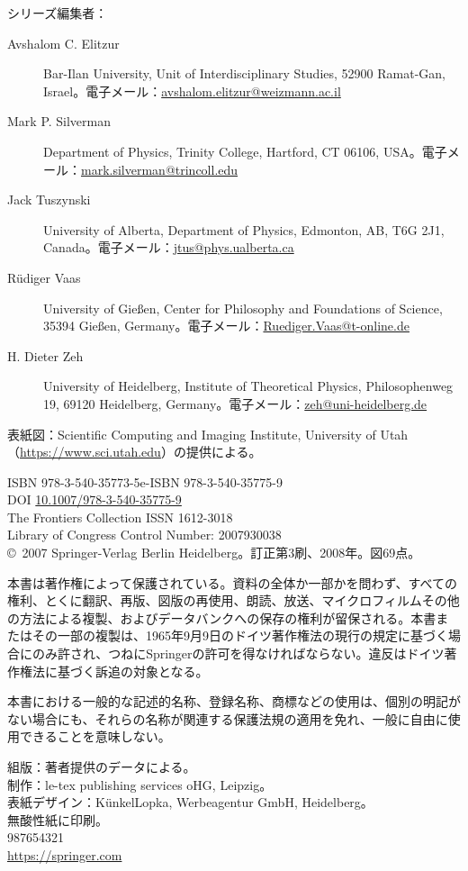 \medskip\noindent シリーズ編集者：
\begin{description}
\item[Avshalom C. Elitzur] Bar-Ilan University, Unit of Interdisciplinary Studies, 52900 Ramat-Gan, Israel。電子メール：\href{mailto:avshalom.elitzur@weizmann.ac.il}{avshalom.elitzur@weizmann.ac.il}
\item[Mark P. Silverman] Department of Physics, Trinity College, Hartford, CT 06106, USA。電子メール：\href{mailto:mark.silverman@trincoll.edu}{mark.silverman@trincoll.edu}
\item[Jack Tuszynski] University of Alberta, Department of Physics, Edmonton, AB, T6G 2J1, Canada。電子メール：\href{mailto:jtus@phys.ualberta.ca}{jtus@phys.ualberta.ca}
\item[Rüdiger Vaas] University of Gießen, Center for Philosophy and Foundations of Science, 35394 Gießen, Germany。電子メール：\href{mailto:Ruediger.Vaas@t-online.de}{Ruediger.Vaas@t-online.de}
\item[H. Dieter Zeh] University of Heidelberg, Institute of Theoretical Physics, Philosophenweg 19, 69120 Heidelberg, Germany。電子メール：\href{mailto:zeh@uni-heidelberg.de}{zeh@uni-heidelberg.de}
\end{description}

表紙図：Scientific Computing and Imaging Institute, University of Utah（\url{https://www.sci.utah.edu}）の提供による。

ISBN 978-3-540-35773-5\quad e-ISBN 978-3-540-35775-9\\
DOI \href{https://doi.org/10.1007/978-3-540-35775-9}{10.1007/978-3-540-35775-9}\\
The Frontiers Collection ISSN 1612-3018\\
Library of Congress Control Number: 2007930038\\
\copyright\ 2007 Springer-Verlag Berlin Heidelberg。訂正第3刷、2008年。図69点。

本書は著作権によって保護されている。資料の全体か一部かを問わず、すべての権利、とくに翻訳、再版、図版の再使用、朗読、放送、マイクロフィルムその他の方法による複製、およびデータバンクへの保存の権利が留保される。本書またはその一部の複製は、1965年9月9日のドイツ著作権法の現行の規定に基づく場合にのみ許され、つねにSpringerの許可を得なければならない。違反はドイツ著作権法に基づく訴追の対象となる。

本書における一般的な記述的名称、登録名称、商標などの使用は、個別の明記がない場合にも、それらの名称が関連する保護法規の適用を免れ、一般に自由に使用できることを意味しない。

組版：著者提供のデータによる。\\
制作：le-tex publishing services oHG, Leipzig。\\
表紙デザイン：KünkelLopka, Werbeagentur GmbH, Heidelberg。\\
無酸性紙に印刷。\\987654321\\\url{https://springer.com}
\endgroup
